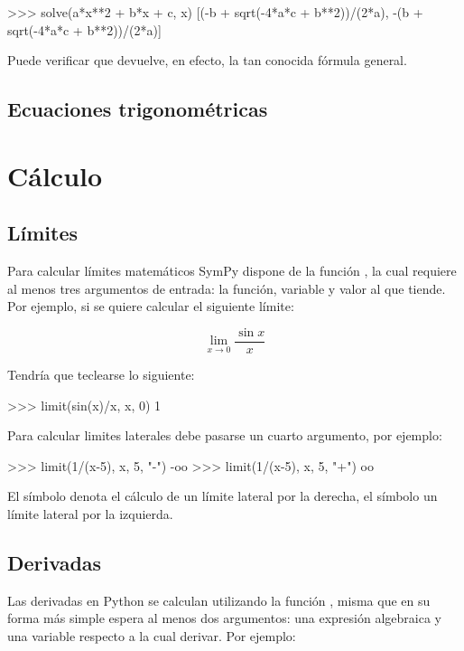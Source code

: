 \begin{python}
>>> solve(a*x**2 + b*x + c, x)
[(-b + sqrt(-4*a*c + b**2))/(2*a), -(b + sqrt(-4*a*c + b**2))/(2*a)]
\end{python}

Puede verificar que devuelve, en efecto, la tan conocida fórmula general.


\subsection{Ecuaciones trigonométricas}




\section{Cálculo}

\subsection{Límites}

Para calcular límites matemáticos SymPy dispone de la función , la cual requiere al menos tres 
argumentos de entrada: la función, variable y valor al que tiende. Por ejemplo, si se quiere calcular 
el siguiente límite:

$$ \lim_{x \to 0} \frac{\sin x}{x} $$

Tendría que teclearse lo siguiente:

\begin{python}
>>> limit(sin(x)/x, x, 0)
1
\end{python}

Para calcular limites laterales debe pasarse un cuarto argumento, por ejemplo:

\begin{python}
>>> limit(1/(x-5), x, 5, "-")
-oo
>>> limit(1/(x-5), x, 5, "+")
oo
\end{python}

El símbolo \code{+} denota el cálculo de un límite lateral por la derecha, 
el símbolo \code{-} un límite lateral por la izquierda.

\subsection{Derivadas}

Las derivadas en Python se calculan utilizando la función , misma que en su forma más simple espera 
al menos dos argumentos: una expresión algebraica y una variable respecto a la cual derivar. Por ejemplo:

